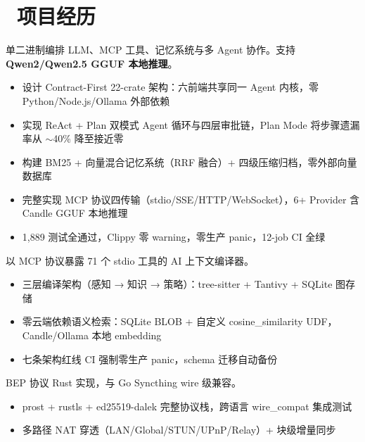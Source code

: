 \documentclass{resume}
\begin{document}
\section{\faUsers\ 项目经历}
单二进制编排 LLM、MCP 工具、记忆系统与多 Agent 协作。支持 \textbf{Qwen2/Qwen2.5 GGUF 本地推理}。
\begin{itemize}
  \item 设计 Contract-First 22-crate 架构：六前端共享同一 Agent 内核，零 Python/Node.js/Ollama 外部依赖
  \item 实现 ReAct + Plan 双模式 Agent 循环与四层审批链，Plan Mode 将步骤遗漏率从 $\sim$40\% 降至接近零
  \item 构建 BM25 + 向量混合记忆系统（RRF 融合）+ 四级压缩归档，零外部向量数据库
  \item 完整实现 MCP 协议四传输（stdio/SSE/HTTP/WebSocket），6+ Provider 含 Candle GGUF 本地推理
  \item 1,889 测试全通过，Clippy 零 warning，零生产 panic，12-job CI 全绿
\end{itemize}

以 MCP 协议暴露 71 个 stdio 工具的 AI 上下文编译器。
\begin{itemize}
  \item 三层编译架构（感知 → 知识 → 策略）：tree-sitter + Tantivy + SQLite 图存储
  \item 零云端依赖语义检索：SQLite BLOB + 自定义 cosine\_similarity UDF，Candle/Ollama 本地 embedding
  \item 七条架构红线 CI 强制零生产 panic，schema 迁移自动备份
\end{itemize}

BEP 协议 Rust 实现，与 Go Syncthing wire 级兼容。
\begin{itemize}
  \item prost + rustls + ed25519-dalek 完整协议栈，跨语言 wire\_compat 集成测试
  \item 多路径 NAT 穿透（LAN/Global/STUN/UPnP/Relay）+ 块级增量同步
\end{itemize}
\end{document}
